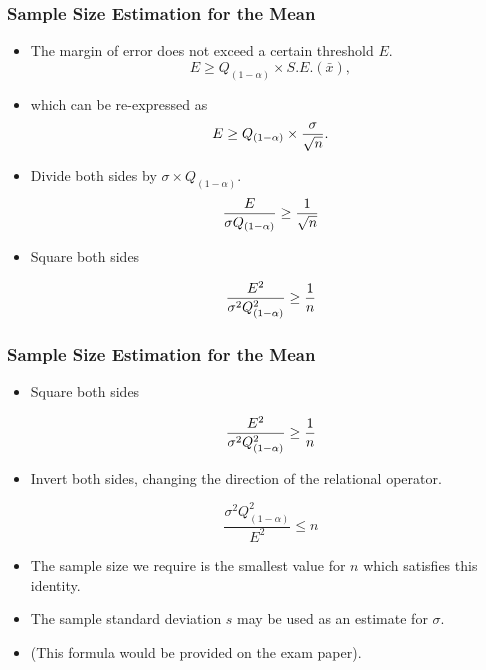 \begin{frame}
\frametitle{Sample Size Estimation for the Mean}

\begin{itemize}

\item The margin of error does not exceed a certain threshold $E$.
\[ E \geq Q_{(1-\alpha)} \times S.E.(\bar{x}), \]

\item which can be re-expressed as
\[E \geq Q_{(1-\alpha)} \times {\sigma \over \sqrt{n} }.\]

\item Divide both sides by $\sigma \times Q_{(1-\alpha)}$.
\[ \frac{E}{\sigma Q_{(1-\alpha)}} \geq {1 \over \sqrt{n} } \]

\item Square both sides

\[ \frac{E^2}{\sigma^2 Q_{(1-\alpha)}^2} \geq {1 \over n } \]


\end{itemize}
\end{frame}
\begin{frame}
\frametitle{Sample Size Estimation for the Mean}

\begin{itemize}
\item Square both sides

\[ \frac{E^2}{\sigma^2 Q^2_{(1-\alpha)}} \geq {1 \over n } \]

\item Invert both sides, changing the direction of the relational operator.

\[ \frac{\sigma^2 Q^2_{(1-\alpha)}}{E^2} \leq n \]


\item The sample size we require is the smallest value for $n$ which satisfies this identity.
\item The sample standard deviation $s$ may be used as an estimate for $\sigma$.
\item (This formula would be provided on the exam paper).
\end{itemize}


\end{frame}

